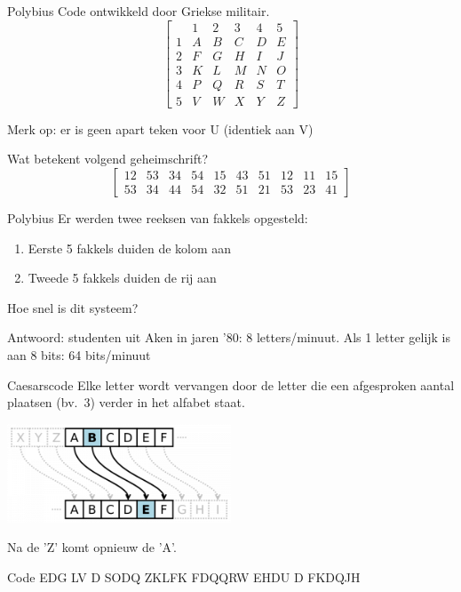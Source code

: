 \documentclass{beamer}
\begin{document}


\begin{frame}{Polybius}
	Code ontwikkeld door Griekse militair.
	\[ \begin{bmatrix}
		  & 1  & 2  & 3  & 4  & 5\\ 
		1 & A  & B  & C  & D  & E\\ 
		2 & F  & G  & H  & I  & J \\ 
		3 & K  & L  & M  & N  & O \\ 
		4 & P  & Q  & R  & S  & T\\ 
		5 & V  & W  & X  & Y  & Z  
	\end{bmatrix}  \]
	
	\pause Merk op: er is geen apart teken voor U (identiek aan V)
	
	\pause
	Wat betekent volgend geheimschrift?
	\[ \begin{bmatrix}
12 & 53 & 34 & 54 & 15 & 43 & 51 & 12 & 11 & 15 \\ 
53 & 34 & 44 & 54 & 32 & 51 & 21 & 53 &23 &41 
\end{bmatrix} \]
\end{frame}


\begin{frame}{Polybius}
	Er werden twee reeksen van fakkels opgesteld:
	\begin{enumerate}
		\item Eerste 5 fakkels duiden de kolom aan
		\item Tweede 5 fakkels duiden de rij aan
	\end{enumerate}
    
    \pause
    Hoe snel is dit systeem?\pause
    
    Antwoord: studenten uit Aken in jaren '80: 8 letters/minuut.\pause
    Als 1 letter gelijk is aan 8 bits: 64 bits/minuut
    
\end{frame}



\begin{frame}[fragile]{Caesarscode}
	Elke letter wordt vervangen door de letter die een afgesproken aantal plaatsen (bv.\ 3) verder in het alfabet staat. 
	
	\begin{center}
		\includegraphics[width=0.5\textwidth]{img/Caesar-Code.png}
	\end{center}
	
	
	Na de 'Z' komt opnieuw de 'A'.
	
	\begin{block}{Code}
	EDG LV D SODQ ZKLFK FDQQRW EHDU D FKDQJH
	\end{block}
\end{frame}
\end{document}
